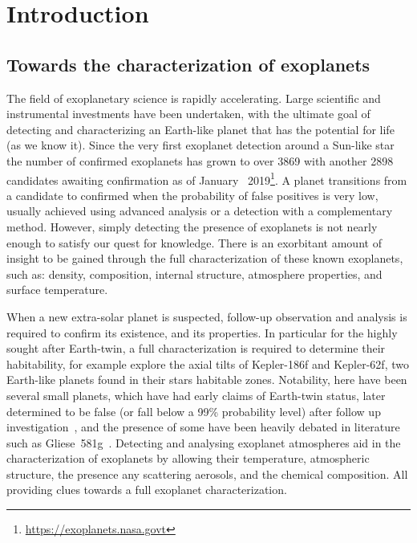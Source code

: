 
\chapter{Introduction}\label{cha:introduction}

\section{Towards the characterization of exoplanets}

The field of exoplanetary science is rapidly accelerating.
Large scientific and instrumental investments have been undertaken, with the ultimate goal of detecting and characterizing an Earth-like planet that has the potential for life (as we know it).
Since the very first exoplanet detection around a Sun-like star~\citep{mayor_jupitermass_1995} the number of confirmed exoplanets has grown to over 3869 with another 2898 candidates awaiting confirmation as of January~ 2019\footnote{\href{https://exoplanets.nasa.gov/}{https://exoplanets.nasa.govt}}.
A planet transitions from a candidate to confirmed when the probability of false positives is very low, usually achieved using advanced analysis or a detection with a complementary method.
However, simply detecting the presence of exoplanets is not nearly enough to satisfy our quest for knowledge.
There is an exorbitant amount of insight to be gained through the full characterization of these known exoplanets, such as: density, composition, internal structure, atmosphere properties, and surface temperature.

When a new extra-solar planet is suspected, follow-up observation and analysis is required to confirm its existence, and its properties.
In particular for the highly sought after Earth-twin, a full characterization is required to determine their habitability, for example \citep{shan_obliquity_2018} explore the axial tilts of {Kepler-186f} and {Kepler-62f}, two Earth-like planets found in their stars habitable zones.
Notability, here have been several small planets, which have had early claims of Earth-twin status, later determined to be false (or fall below a 99\% probability level) after follow up investigation~\citep[e.g.][]{mullally_kepler_2018,burke_reevaluating_2019}, and the presence of some have been heavily debated in literature such as {Gliese~581g}~\citep{vogt_lickcarnegie_2010, gregory_bayesian_2011,robertson_stellar_2014}.
Detecting and analysing exoplanet atmospheres aid in the characterization of exoplanets by allowing their temperature, atmospheric structure, the presence any scattering aerosols, and the chemical composition.
All providing clues towards a full exoplanet characterization.

